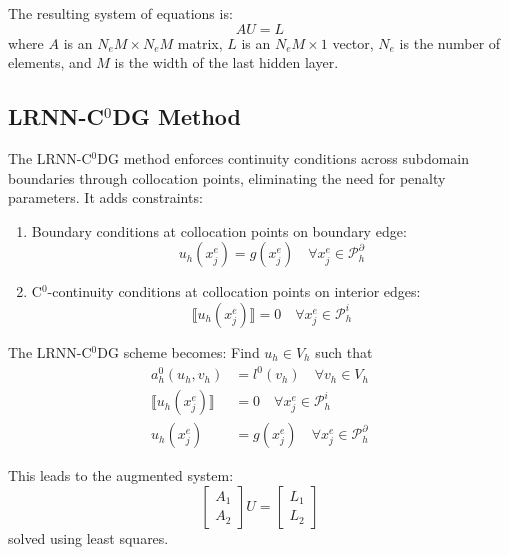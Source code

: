 \documentclass[11pt,a4paper]{article}
\begin{document}
The resulting system of equations is:
\begin{equation}
AU = L
\end{equation}
where $A$ is an $N_e M \times N_e M$ matrix, $L$ is an $N_e M \times 1$ vector, $N_e$ is the number of elements, and $M$ is the width of the last hidden layer.

\subsection{LRNN-C$^0$DG Method}

The LRNN-C$^0$DG method enforces continuity conditions across subdomain boundaries through collocation points, eliminating the need for penalty parameters. It adds constraints:

\begin{enumerate}
    \item Boundary conditions at collocation points on boundary edge:
    \begin{equation}
    u_h(x_j^e) = g(x_j^e) \quad \forall x_j^e \in \mathcal{P}_h^{\partial}
    \end{equation}
    
    \item C$^0$-continuity conditions at collocation points on interior edges:
    \begin{equation}
    \llbracket u_h(x_j^e) \rrbracket = 0 \quad \forall x_j^e \in \mathcal{P}_h^i
    \end{equation}
\end{enumerate}

The LRNN-C$^0$DG scheme becomes: Find $u_h \in V_h$ such that
\begin{align}
a_h^0(u_h, v_h) &= l^0(v_h) \quad \forall v_h \in V_h\\
\llbracket u_h(x_j^e) \rrbracket &= 0 \quad \forall x_j^e \in \mathcal{P}_h^i\\
u_h(x_j^e) &= g(x_j^e) \quad \forall x_j^e \in \mathcal{P}_h^{\partial}
\end{align}

This leads to the augmented system:
\begin{equation}
\begin{bmatrix} A_1 \\ A_2 \end{bmatrix} U = \begin{bmatrix} L_1 \\ L_2 \end{bmatrix}
\end{equation}
solved using least squares.
\end{document}
